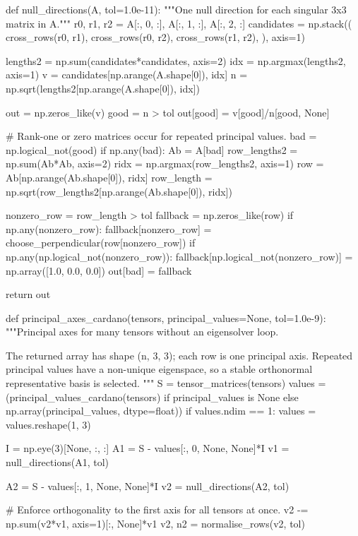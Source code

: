 \begin{itemize}
\begin{python}
def null_directions(A, tol=1.0e-11):
    """One null direction for each singular 3x3 matrix in A."""
    r0, r1, r2 = A[:, 0, :], A[:, 1, :], A[:, 2, :]
    candidates = np.stack((
        cross_rows(r0, r1),
        cross_rows(r0, r2),
        cross_rows(r1, r2),
    ), axis=1)

    lengths2 = np.sum(candidates*candidates, axis=2)
    idx = np.argmax(lengths2, axis=1)
    v = candidates[np.arange(A.shape[0]), idx]
    n = np.sqrt(lengths2[np.arange(A.shape[0]), idx])

    out = np.zeros_like(v)
    good = n > tol
    out[good] = v[good]/n[good, None]

    # Rank-one or zero matrices occur for repeated principal values.
    bad = np.logical_not(good)
    if np.any(bad):
        Ab = A[bad]
        row_lengths2 = np.sum(Ab*Ab, axis=2)
        ridx = np.argmax(row_lengths2, axis=1)
        row = Ab[np.arange(Ab.shape[0]), ridx]
        row_length = np.sqrt(row_lengths2[np.arange(Ab.shape[0]), ridx])

        nonzero_row = row_length > tol
        fallback = np.zeros_like(row)
        if np.any(nonzero_row):
            fallback[nonzero_row] = choose_perpendicular(row[nonzero_row])
        if np.any(np.logical_not(nonzero_row)):
            fallback[np.logical_not(nonzero_row)] = np.array([1.0, 0.0, 0.0])
        out[bad] = fallback

    return out


def principal_axes_cardano(tensors, principal_values=None, tol=1.0e-9):
    """Principal axes for many tensors without an eigensolver loop.

    The returned array has shape (n, 3, 3); each row is one principal axis.
    Repeated principal values have a non-unique eigenspace, so a stable
    orthonormal representative basis is selected.
    """
    S = tensor_matrices(tensors)
    values = (principal_values_cardano(tensors)
              if principal_values is None
              else np.array(principal_values, dtype=float))
    if values.ndim == 1:
        values = values.reshape(1, 3)

    I = np.eye(3)[None, :, :]
    A1 = S - values[:, 0, None, None]*I
    v1 = null_directions(A1, tol)

    A2 = S - values[:, 1, None, None]*I
    v2 = null_directions(A2, tol)

    # Enforce orthogonality to the first axis for all tensors at once.
    v2 -= np.sum(v2*v1, axis=1)[:, None]*v1
    v2, n2 = normalise_rows(v2, tol)


\end{python}
\end{itemize}
